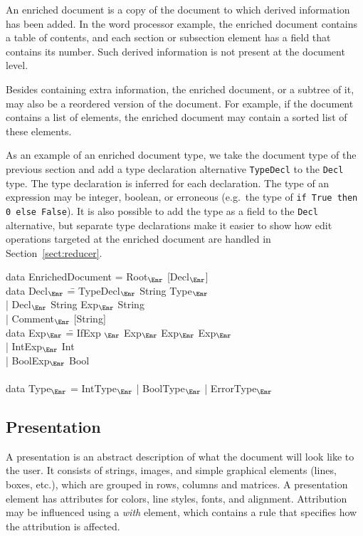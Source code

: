 An enriched document is a copy of the document to which derived information has been added. In the word processor example, the enriched document contains a table of contents, and each section or subsection element has a field that contains its number. Such derived information is not present at the document level.

Besides containing extra information, the enriched document, or a subtree of it, may also be a reordered version of the document. For example, if the document contains a list of elements, the enriched document may contain a sorted list of these elements.

As an example of an enriched document type, we take the document type of the previous section and add a type declaration alternative {\tt TypeDecl} to the {\tt Decl} type. The type declaration is inferred for each declaration. The type of an expression may be integer, boolean, or erroneous (e.g.\ the type of {\tt if True then 0 else False}). It is also possible to add the type as a field to the {\tt Decl} alternative, but separate type declarations make it easier to show how edit operations targeted at the enriched document are handled in Section~\ref{sect:reducer}.

\noindent
\ttfamily
\begin{tabbing}
data EnrichedDocument = Root$_{\Enr}$ [Decl$_{\Enr}$]\\
data Decl$_{\Enr}$ \= = TypeDecl$_{\Enr}$ String Type$_{\Enr}$\\
                           \> | Decl$_{\Enr}$ String Exp$_{\Enr}$ String\\
                           \> | Comment$_{\Enr}$ [String]\\
data Exp$_{\Enr}$ \= =  IfExp $_{\Enr}$ Exp$_{\Enr}$ Exp$_{\Enr}$ Exp$_{\Enr}$\\
                 \> | IntExp$_{\Enr}$ Int\\
                 \> | BoolExp$_{\Enr}$ Bool\\
\\
data Type$_{\Enr}$ = IntType$_{\Enr}$ | BoolType$_{\Enr}$ | ErrorType$_{\Enr}$
\end{tabbing}
\rmfamily


%																
\subsection{Presentation} \label{sect:presLevel}

A presentation is an abstract description of what the document will look like to the user. It consists of strings, images, and simple graphical elements (lines, boxes, etc.), which are grouped in rows, columns and matrices. A presentation element has attributes for colors, line styles, fonts, and alignment. Attribution may be influenced using a {\em with} element, which contains a rule that specifies how the attribution is affected.

